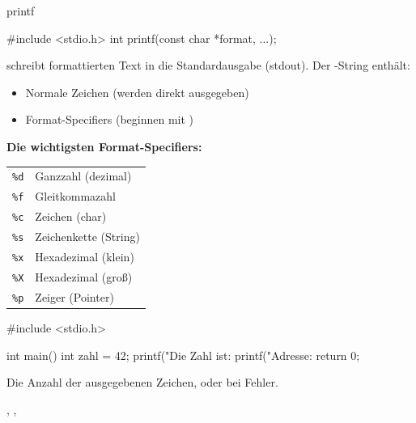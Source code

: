 \begin{man}[stdio]{printf}
    \begin{synopsis}
        \begin{plaincode}[gobble=8]
        #include <stdio.h>
        int printf(const char *format, ...);
        \end{plaincode}
    \end{synopsis}

    \begin{desc}
         schreibt formattierten Text in die Standardausgabe (stdout). Der -String enthält:
        \begin{itemize}
            \item Normale Zeichen (werden direkt ausgegeben)
            \item Format-Specifiers (beginnen mit \codeinline{\%})
        \end{itemize}

        \textbf{Die wichtigsten Format-Specifiers:}

        \begin{tabular}{ll}
        \texttt{\%d} & Ganzzahl (dezimal) \\
        \texttt{\%f} & Gleitkommazahl \\
        \texttt{\%c} & Zeichen (char) \\
        \texttt{\%s} & Zeichenkette (String) \\
        \texttt{\%x} & Hexadezimal (klein) \\
        \texttt{\%X} & Hexadezimal (groß) \\
        \texttt{\%p} & Zeiger (Pointer) \\
        \end{tabular}
    \end{desc}

    \begin{example}
        \begin{code}
#include <stdio.h>

int main() {
    int zahl = 42;
    printf("Die Zahl ist: %
    printf("Adresse: %
    return 0;
}
        \end{code}
    \end{example}

    \begin{returns}
        Die Anzahl der ausgegebenen Zeichen, oder  bei Fehler.
    \end{returns}

    \begin{seealso}
        , , 
    \end{seealso}
\end{man}

